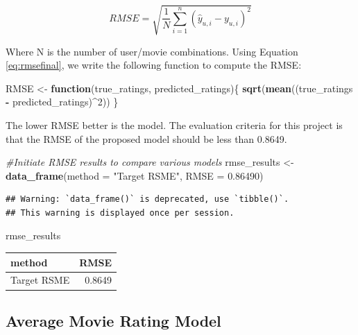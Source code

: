 \documentclass[]{article}
\newenvironment{Shaded}{\begin{snugshade}}{\end{snugshade}}
\newcommand{\CommentTok}[1]{\textcolor[rgb]{0.56,0.35,0.01}{\textit{#1}}}
\newcommand{\ControlFlowTok}[1]{\textcolor[rgb]{0.13,0.29,0.53}{\textbf{#1}}}
\newcommand{\DataTypeTok}[1]{\textcolor[rgb]{0.13,0.29,0.53}{#1}}
\newcommand{\DecValTok}[1]{\textcolor[rgb]{0.00,0.00,0.81}{#1}}
\newcommand{\FloatTok}[1]{\textcolor[rgb]{0.00,0.00,0.81}{#1}}
\newcommand{\KeywordTok}[1]{\textcolor[rgb]{0.13,0.29,0.53}{\textbf{#1}}}
\newcommand{\NormalTok}[1]{#1}
\newcommand{\OperatorTok}[1]{\textcolor[rgb]{0.81,0.36,0.00}{\textbf{#1}}}
\newcommand{\StringTok}[1]{\textcolor[rgb]{0.31,0.60,0.02}{#1}}
\begin{document}
\begin{equation}
\label{eq:rmsefinal}
RMSE = \sqrt{\frac{1}{N}\displaystyle\sum_{i=1}^{n} (\hat{y}_{u,i}-y_{u,i})^{2}}
\end{equation}

Where N is the number of user/movie combinations. Using Equation
\ref{eq:rmsefinal}, we write the following function to compute the RMSE:

\begin{Shaded}
\begin{Highlighting}[]
\NormalTok{RMSE <-}\StringTok{ }\ControlFlowTok{function}\NormalTok{(true_ratings, predicted_ratings)\{}
  \KeywordTok{sqrt}\NormalTok{(}\KeywordTok{mean}\NormalTok{((true_ratings }\OperatorTok{-}\StringTok{ }\NormalTok{predicted_ratings)}\OperatorTok{^}\DecValTok{2}\NormalTok{))}
\NormalTok{\}}
\end{Highlighting}
\end{Shaded}

The lower RMSE better is the model. The evaluation criteria for this
project is that the RMSE of the proposed model should be less than
0.8649.

\begin{Shaded}
\begin{Highlighting}[]
\CommentTok{#Initiate RMSE results to compare various models}
\NormalTok{rmse_results <-}\StringTok{ }\KeywordTok{data_frame}\NormalTok{(}\DataTypeTok{method =} \StringTok{"Target RSME"}\NormalTok{, }\DataTypeTok{RMSE =} \FloatTok{0.86490}\NormalTok{)}
\end{Highlighting}
\end{Shaded}

\begin{verbatim}
## Warning: `data_frame()` is deprecated, use `tibble()`.
## This warning is displayed once per session.
\end{verbatim}

\begin{Shaded}
\begin{Highlighting}[]
\NormalTok{rmse_results}
\end{Highlighting}
\end{Shaded}

\begin{longtable}[]{@{}lr@{}}
\toprule
method & RMSE\tabularnewline
\midrule
\endhead
Target RSME & 0.8649\tabularnewline
\bottomrule
\end{longtable}

\subsection{Average Movie Rating Model}
\label{sec:am}
\end{document}
